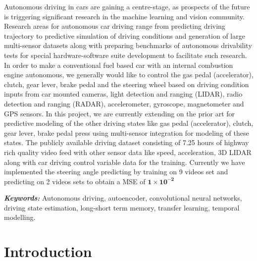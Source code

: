\documentclass[a4paper,11pt,titlepage,drop]{article}%
\begin{document}
Autonomous driving in cars are gaining a centre-stage, as prospects of the future is triggering significant research in the machine learning and vision community. Research areas for autonomous car driving range from predicting driving trajectory to predictive simulation of driving conditions and generation of large multi-sensor datasets along with preparing benchmarks of autonomous drivability tests for special hardware-software suite development to facilitate such research. In order to  make a conventional fuel based car with an internal combustion engine autonomous, we generally would like to control the gas pedal (accelerator), clutch, gear lever, brake pedal and the steering wheel based on driving condition inputs from car mounted cameras, light detection and ranging (LIDAR), radio detection and ranging (RADAR), accelerometer, gyroscope, magnetometer and GPS sensors. In this project, we are currently extending on the prior art for predictive modeling of the other driving states like gas pedal (accelerator), clutch, gear lever, brake pedal press using multi-sensor integration for modeling of these states. The publicly available driving dataset consisting of 7.25 hours of highway rich quality video feed with other sensor data like speed, acceleration, 3D LIDAR along with car driving control variable data for the training. Currently we have implemented the steering angle predicting by training on 9 videos set and predicting on 2 videos sets to obtain a MSE of $\mathbf{1\times10^{-2}}$


\vskip 2in

\noindent\textbf{\textit{Keywords:}} Autonomous driving, autoencoder, convolutional neural networks, driving state estimation, long-short term memory, transfer learning, temporal modelling.

\newpage

\singlespacing

\setcounter{tocdepth}{2}
\thispagestyle{empty}
\tableofcontents
\newpage

\setcounter{page}{1}

\onehalfspacing


\section{Introduction}
\end{document}
